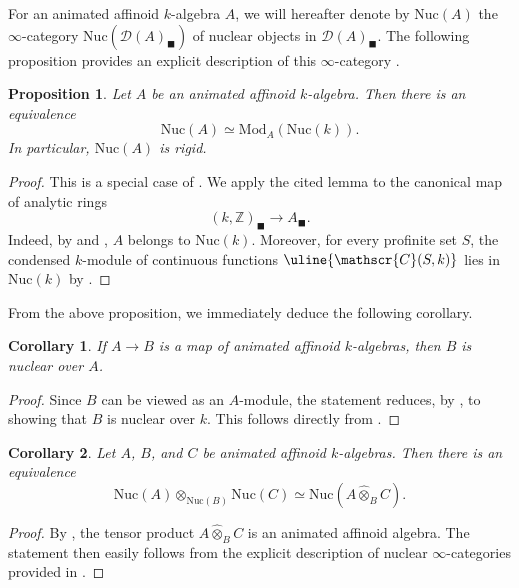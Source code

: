 \documentclass[oneside, hidelinks, 12pt, a4paper,reqno]{amsart}
\theoremstyle{plain}
\theoremstyle{definition}
\theoremstyle{plain}
\newtheorem{corollary}[corollary]{Corollary}
\newtheorem{proposition}[proposition]{Proposition}
\newcommand{\Z}{\mathbb Z}
\newcommand{\cD}{\mathscr D}
\newcommand{\cat}{$\infty$-category }
\newcommand{\cates}{$\infty$-categories }
\newcommand{\Nuc}{\mathrm{Nuc}}
\newcommand{\Mod}{\mathrm{Mod}}
\newcommand{\Solid}{\blacksquare}
\begin{document}
For an animated affinoid $k$-algebra $A$, we will hereafter denote by $\Nuc(A)$ the \cat $\Nuc(\cD(A)_\Solid)$ of nuclear objects in $\cD(A)_\Solid$. The following proposition provides an explicit description of this \cat.

\begin{proposition}\label{prop: nuclear categories as module categories}
    Let $A$ be an animated affinoid $k$-algebra. Then there is an equivalence 
    \[
    \Nuc(A) \simeq \Mod_{A}(\Nuc(k)).
    \]
    In particular, $\Nuc(A)$ is rigid.
\end{proposition}
\begin{proof}
    This is a special case of \cite[Lemma 4.4.7]{wang2026relativegagatheoremapplication}. We apply the cited lemma to the canonical map of analytic rings 
    \[
    (k,\Z)_\Solid \to A_\Solid.
    \]
    Indeed, by  and , $A$ belongs to $\Nuc(k)$. Moreover, for every profinite set $S$, the condensed $k$-module of continuous functions $\uline{\mathscr{C}(S,k)}$ lies in $\Nuc(k)$ by \cite[Kollar 3.14]{andreychev2023ktheorieadischerraume}.
\end{proof}

From the above proposition, we immediately deduce the following corollary.

\begin{corollary}\label{cor: relative nuclearity affinoid case}
    If $A \to B$ is a map of animated affinoid $k$-algebras, then $B$ is nuclear over $A$. 
\end{corollary}
\begin{proof}
    Since $B$ can be viewed as an $A$-module, the statement reduces, by , to showing that $B$ is nuclear over $k$. This follows directly from .
\end{proof}

\begin{corollary}\label{Kunneth formula nuclear affine case}
    Let $A$, $B$, and $C$ be animated affinoid $k$-algebras. Then there is an equivalence 
    \[
    \Nuc(A) \otimes_{\Nuc(B)} \Nuc(C) \simeq \Nuc(A \widehat{\otimes}_{B} C).
    \]
\end{corollary}
\begin{proof}
    By , the tensor product $A \widehat{\otimes}_B C$ is an animated affinoid algebra. The statement then easily follows from the explicit description of nuclear \cates provided in . 
\end{proof}
\end{document}

